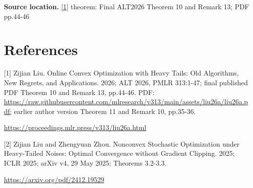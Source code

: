 \documentclass[10pt,a4paper]{article}
\begin{document}
\textbf{Source location.} \href{https://proceedings.mlr.press/v313/liu26a.html}{[1]} theorem: Final ALT2026 Theorem 10 and Remark 13; PDF pp.44-46

\section{References}
[1] Zijian Liu. Online Convex Optimization with Heavy Tails: Old Algorithms, New Regrets, and Applications. 2026; ALT 2026, PMLR 313:1-47; final published PDF Theorem 10 and Remark 13, pp.44-46. PDF: \url{https://raw.githubusercontent.com/mlresearch/v313/main/assets/liu26a/liu26a.pdf;} earlier author version Theorem 11 and Remark 10, pp.35-36.

\url{https://proceedings.mlr.press/v313/liu26a.html}

[2] Zijian Liu and Zhengyuan Zhou. Nonconvex Stochastic Optimization under Heavy-Tailed Noises: Optimal Convergence without Gradient Clipping. 2025; ICLR 2025; arXiv v4, 29 May 2025; Theorems 3.2-3.3.

\url{https://arxiv.org/pdf/2412.19529}
\end{document}
